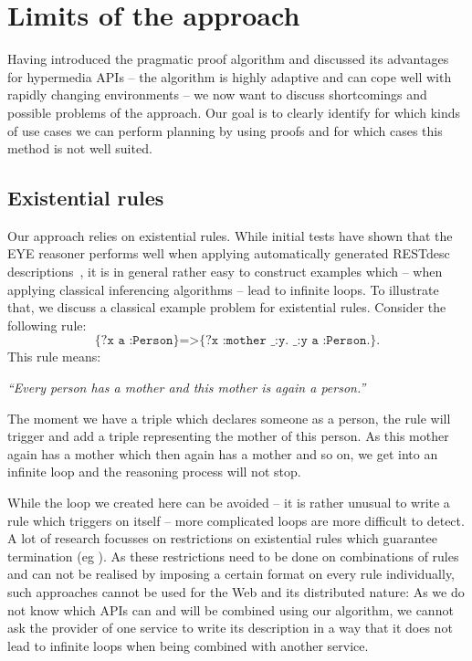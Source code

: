 \section{Limits of the approach}\label{sec:limits}
Having introduced the pragmatic proof algorithm and discussed its advantages for hypermedia APIs -- the algorithm is highly adaptive and can cope well with rapidly 
changing environments -- we now want to discuss shortcomings and possible problems of the approach.
Our
goal is to clearly identify for which kinds of use cases we can perform planning by using proofs and for which cases this method is not well suited.

\subsection{Existential rules}
Our approach relies on existential rules. While initial tests have shown that the EYE reasoner performs well when applying automatically generated RESTdesc 
descriptions~\cite{PP}, it is in general rather easy to construct examples which -- when applying classical inferencing algorithms -- 
lead to infinite loops. To illustrate that, we discuss a classical example problem for existential rules. Consider the following rule:
\[
\texttt{ \{?x a :Person\}=>\{?x :mother \_:y. \_:y a :Person.\}. }
\]
This rule means:

\begin{center}\textit{``Every person has a mother and this mother is again a person.''}\end{center}

The moment we have a triple which declares someone as a person, the rule will trigger and add a triple representing
the mother of this person. As this mother again has a mother which then again has a mother and so on, we get into an infinite loop and the reasoning process will not stop.

While the loop we created here can be avoided -- it is rather unusual to write a rule which triggers on itself -- more complicated loops are more difficult to detect.
A lot of research focusses on restrictions on existential rules which guarantee termination %
(eg \cite{krotzsch2011extending,gottlob2013combining,Baget}). 
As these restrictions need to be done on combinations of rules and can not be realised by imposing a certain format on every rule individually, such approaches cannot be 
used for the Web and its distributed nature: As we do not know which APIs can and will be combined using our algorithm, we cannot ask the provider of one service 
to write its description in a way that it does not lead to infinite loops when being combined with another service.

